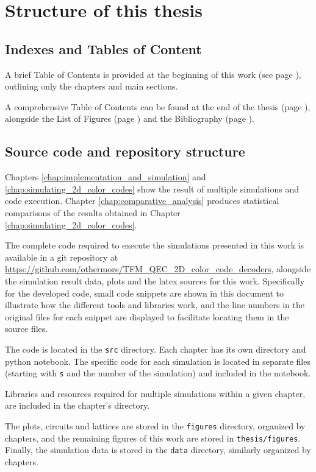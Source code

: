 \chapter*{Structure of this thesis}

\section*{Indexes and Tables of Content}
A brief Table of Contents is provided at the beginning of this work (see page \pageref{label:short_toc}), outlining only the chapters and main sections. 

A comprehensive Table of Contents can be found at the end of the thesis (page \pageref{label:full_toc}), alongside the List of Figures (page \pageref{label:list_of_figures}) and the Bibliography (page \pageref{label:bib_references}). 

\section*{Source code and repository structure}
\label{sec:source_code_repository}
Chapters \ref{chap:implementation_and_simulation} and \ref{chap:simulating_2d_color_codes} show the result of multiple simulations and code execution. Chapter \ref{chap:comparative_analysis} produces statistical comparisons of the results obtained in Chapter \ref{chap:simulating_2d_color_codes}.

The complete code required to execute the simulations presented in this work is available in a git repository at \url{https://github.com/othermore/TFM_QEC_2D_color_code_decoders}, alongside the simulation result data, plots and the latex sources for this work. Specifically for the developed code, small code snippets are shown in this document to illustrate how the different tools and libraries work, and the line numbers in the original files for each snippet are displayed to facilitate locating them in the source files.

The code is located in the \texttt{src} directory. Each chapter has its own directory and python notebook. The specific code for each simulation is located in separate files (starting with \texttt{s} and the number of the simulation) and included in the notebook. 

Libraries and resources required for multiple simulations within a given chapter, are included in the chapter's directory.

The plots, circuits and lattices are stored in the \texttt{figures} directory, organized by chapters, and the remaining figures of this work are stored in \texttt{thesis/figures}. Finally, the simulation data is stored in the \texttt{data} directory, similarly organized by chapters.
